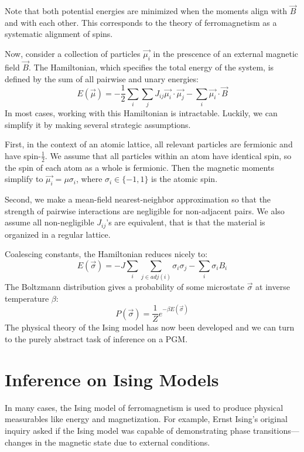 \documentclass{article}
\begin{document}
Note that both potential energies are minimized when the moments align with 
$\vec{B}$ and with each other. 
This corresponds to the theory of ferromagnetism as a systematic alignment of 
spins. 

Now, consider a collection of particles $\vec{\mu_i}$ in the prescence of an 
external magnetic field $\vec{B}$. 
The Hamiltonian, which specifies the total energy of the system, is defined by 
the sum of all pairwise and unary energies:
\begin{equation}\label{exactE}
    E(\vec{\mu}) = -\frac{1}{2}\sum_i \sum_j J_{ij} \vec{\mu_i} \cdot \vec{\mu_j} - \sum_i \vec{\mu_i} \cdot \vec{B}
\end{equation}
In most cases, working with this Hamiltonian is intractable. 
Luckily, we can simplify it by making several strategic assumptions. 

First, in the context of an atomic lattice, all relevant particles are fermionic 
and have spin-$\frac{1}{2}$. 
We assume that all particles within an atom have identical spin, so the spin of 
each atom as a whole is fermionic. 
Then the magnetic moments simplify to $\vec{\mu_i} = \mu \sigma_i$, where 
$\sigma_i \in \{-1, 1\}$ is the atomic spin. 

Second, we make a mean-field nearest-neighbor approximation so that the strength 
of pairwise interactions are negligible for non-adjacent pairs. 
We also assume all non-negligible $J_{ij}$'s are equivalent, that is that the 
material is organized in a regular lattice. 

Coalescing constants, the Hamiltonian reduces nicely to:
\begin{equation}\label{isingE}
    E(\vec{\sigma}) = -J\sum_i \sum_{j \in adj(i)} \sigma_i \sigma_j - \sum_i \sigma_i B_i
\end{equation}
The Boltzmann distribution gives a probability of some microstate $\vec{\sigma}$ 
at inverse temperature $\beta$:
\begin{equation} \label{boltzmann}
    P(\vec{\sigma}) = \frac{1}{Z}e^{-\beta E(\vec{\sigma})} 
\end{equation}
The physical theory of the Ising model has now been developed and we can turn to 
the purely abstract task of inference on a PGM. 
%
%
%
%
%
\section{Inference on Ising Models}
%
%
%
%
%
In many cases, the Ising model of ferromagnetism is used to produce physical 
measurables like energy and magnetization. 
For example, Ernst Ising's original inquiry asked if the Ising model was capable 
of demonstrating phase transitions—changes in the magnetic state due to external 
conditions. 
\end{document}
